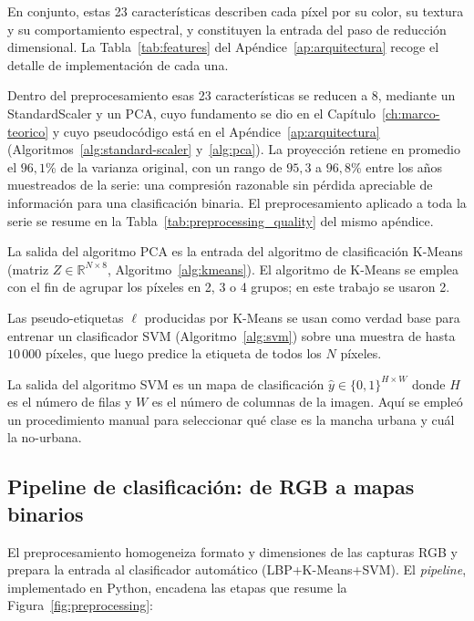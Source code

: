 En conjunto, estas 23 características describen cada píxel por su color, su textura y su comportamiento espectral, y constituyen la entrada del paso de reducción dimensional. La Tabla~\ref{tab:features} del Apéndice~\ref{ap:arquitectura} recoge el detalle de implementación de cada una.

Dentro del preprocesamiento esas 23 características se reducen a 8, mediante un StandardScaler y un PCA, cuyo fundamento se dio en el Capítulo~\ref{ch:marco-teorico} y cuyo pseudocódigo está en el Apéndice~\ref{ap:arquitectura} (Algoritmos~\ref{alg:standard-scaler} y~\ref{alg:pca}). La proyección retiene en promedio el $96{,}1$\% de la varianza original, con un rango de $95{,}3$ a $96{,}8$\% entre los años muestreados de la serie: una compresión razonable sin pérdida apreciable de información para una clasificación binaria. El preprocesamiento aplicado a toda la serie se resume en la Tabla~\ref{tab:preprocessing_quality} del mismo apéndice.

La salida del algoritmo PCA es la entrada del algoritmo de clasificación K-Means (matriz $Z \in \mathbb{R}^{N \times 8}$, Algoritmo~\ref{alg:kmeans}). El algoritmo de K-Means se emplea con el fin de agrupar los píxeles en 2, 3 o 4 grupos; en este trabajo se usaron 2.

Las pseudo-etiquetas $\ell$ producidas por K-Means se usan como verdad base para
entrenar un clasificador SVM (Algoritmo~\ref{alg:svm}) sobre una muestra de hasta $10\,000$ píxeles, que luego
predice la etiqueta de todos los $N$ píxeles.

La salida del algoritmo SVM es un mapa de clasificación $\hat{y} \in \{0,1\}^{H \times W}$ donde $H$ es el número de filas y $W$ es el número de columnas de la imagen. Aquí se empleó un procedimiento manual para seleccionar qué clase es la mancha urbana y cuál la no-urbana.

\subsection{Pipeline de clasificación: de RGB a mapas binarios}

El preprocesamiento homogeneiza formato y dimensiones de las capturas RGB y prepara la entrada al clasificador automático (LBP+K-Means+SVM). El \textit{pipeline}, implementado en Python, encadena las etapas que resume la Figura~\ref{fig:preprocessing}:

